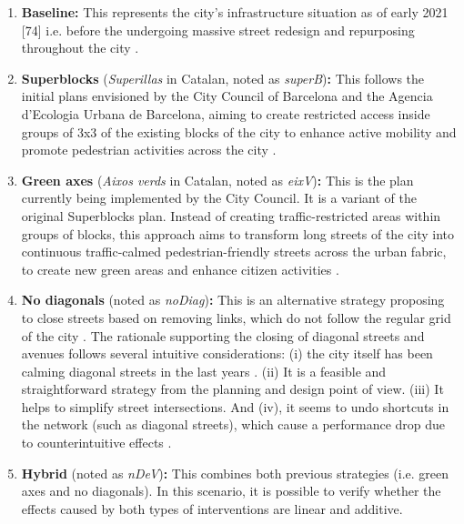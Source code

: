 \begin{enumerate}[label=\alph*]
    \item \textbf{Baseline}\textbf{:} This represents the city's infrastructure situation as of early 2021 [74] \citep{ArgotaSanchez-Vaquerizo2021} i.e. before the undergoing massive street redesign and repurposing throughout the city \citep{AjuntamentdeBarcelona2020implementingSuperblocks}.
    \item \textbf{Superblocks} (\emph{Superillas} in Catalan, noted as \emph{superB})\textbf{:} This follows the initial plans envisioned by the City Council of Barcelona and the Agencia d’Ecologia Urbana de Barcelona, aiming to create restricted access inside groups of 3x3 of the existing blocks of the city to enhance active mobility and promote pedestrian activities across the city \citep{Rueda2018}.
    \item \textbf{Green axes} (\emph{Aixos verds} in Catalan, noted as \emph{eixV})\textbf{:} This is the plan currently being implemented by the City Council. It is a variant of the original Superblocks plan. Instead of creating traffic-restricted areas within groups of blocks, this approach aims to transform long streets of the city into continuous traffic-calmed pedestrian-friendly streets across the urban fabric, to create new green areas and enhance citizen activities \citep{AjuntamentdeBarcelona2021c}.
    \item \textbf{No diagonals} (noted as \emph{noDiag})\textbf{:} This is an alternative strategy proposing to close streets based on removing links, which do not follow the regular grid of the city \citep{Cerda1867}. The rationale supporting the closing of diagonal streets and avenues follows several intuitive considerations: (i) the city itself has been calming diagonal streets in the last years \citep{EuropaPress2009}. (ii) It is a feasible and straightforward strategy from the planning and design point of view. (iii) It helps to simplify street intersections. And (iv), it seems to undo shortcuts in the network  (such as diagonal streets), which cause a performance drop due to counterintuitive effects \citep{Braess1969,Sheffi1978}.
    \item \textbf{Hybrid} (noted as \emph{nDeV})\textbf{:} This combines both previous strategies (i.e. green axes and no diagonals). In this scenario, it is possible to verify whether the effects caused by both types of interventions are linear and additive. 
\end{enumerate}

